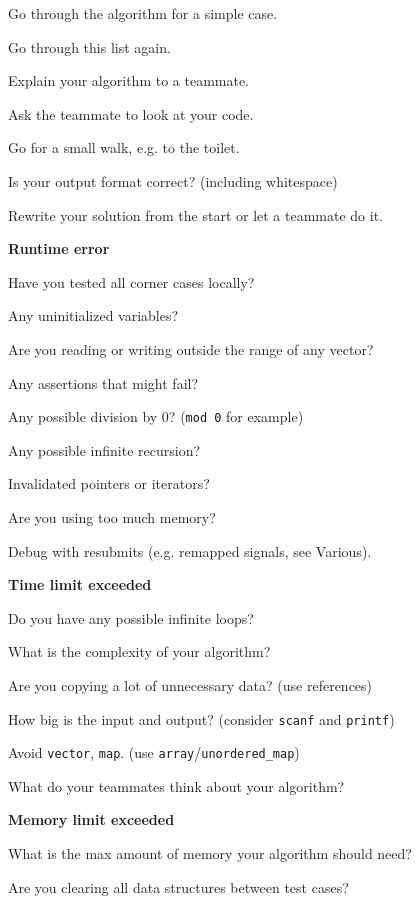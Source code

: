 \documentclass[a4paper]{article}
\begin{document}
\noindent
Go through the algorithm for a simple case.

\noindent
Go through this list again.

\noindent
Explain your algorithm to a teammate.

\noindent
Ask the teammate to look at your code.

\noindent
Go for a small walk, e.g. to the toilet.

\noindent
Is your output format correct? (including whitespace)

\noindent
Rewrite your solution from the start or let a teammate do it.

\noindent
\textbf{Runtime error}

\noindent
Have you tested all corner cases locally?

\noindent
Any uninitialized variables?

\noindent
Are you reading or writing outside the range of any vector?

\noindent
Any assertions that might fail?

\noindent
Any possible division by 0? (\texttt{mod 0} for example)

\noindent
Any possible infinite recursion?

\noindent
Invalidated pointers or iterators?

\noindent
Are you using too much memory?

\noindent
Debug with resubmits (e.g. remapped signals, see Various).

\noindent
\textbf{Time limit exceeded}

\noindent
Do you have any possible infinite loops?

\noindent
What is the complexity of your algorithm?

\noindent
Are you copying a lot of unnecessary data? (use references)

\noindent
How big is the input and output? (consider \texttt{scanf} and \texttt{printf})

\noindent
Avoid \texttt{vector}, \texttt{map}. (use \texttt{array}/\texttt{unordered\_map})

\noindent
What do your teammates think about your algorithm?

\noindent
\textbf{Memory limit exceeded}

\noindent
What is the max amount of memory your algorithm should need?

\noindent
Are you clearing all data structures between test cases?
\end{document}
